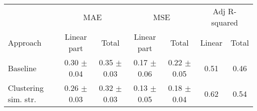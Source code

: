    \begin{tabular}{l c c c c c c }
    \toprule
    
    & \multicolumn{2}{c}{MAE} & \multicolumn{2}{c}{MSE}  & \multicolumn{2}{c}{Adj R-squared}  \\
    \cmidrule(r){2-3} 
    \cmidrule(r){4-5}
    \cmidrule(r){6-7}

    Approach & Linear part & Total & Linear part & Total & Linear & Total \\
    \midrule
    Baseline            & 0.30 $\pm$ 0.04 & 0.35 $\pm$ 0.03 & 0.17 $\pm$ 0.06 & 0.22 $\pm$ 0.05 & 0.51 & 0.46 \\
    Clustering sim. str.  & 0.26 $\pm$ 0.03 & 0.32 $\pm$ 0.03 & 0.13 $\pm$ 0.05 & 0.18 $\pm$ 0.04 & 0.62 & 0.54 \\
    
    \bottomrule
    \end{tabular}
    